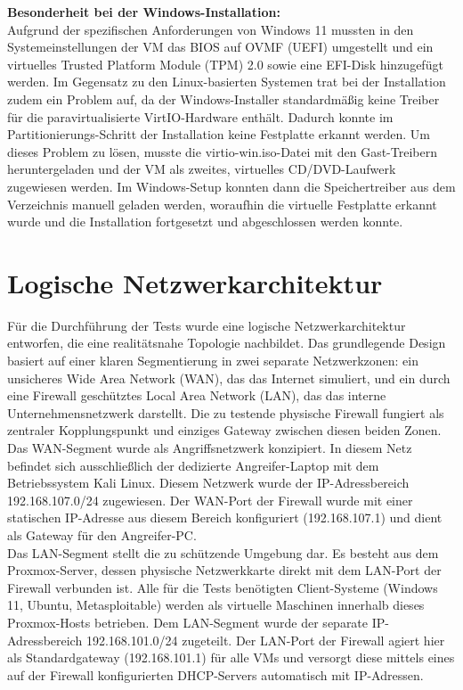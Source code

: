 \textbf{Besonderheit bei der Windows-Installation:}\\
Aufgrund der spezifischen Anforderungen von Windows 11 mussten in den Systemeinstellungen der VM das BIOS auf OVMF (UEFI) umgestellt und ein virtuelles Trusted Platform Module (TPM) 2.0 sowie eine EFI-Disk hinzugefügt werden.
 Im Gegensatz zu den Linux-basierten Systemen trat bei der Installation zudem ein Problem auf, da der Windows-Installer standardmäßig keine Treiber für die paravirtualisierte VirtIO-Hardware enthält. Dadurch konnte im Partitionierungs-Schritt der Installation keine Festplatte erkannt werden. Um dieses Problem zu lösen, musste die virtio-win.iso-Datei mit den Gast-Treibern heruntergeladen und der VM als zweites, virtuelles CD/DVD-Laufwerk zugewiesen werden. Im Windows-Setup konnten dann die Speichertreiber aus dem Verzeichnis  manuell geladen werden, woraufhin die virtuelle Festplatte erkannt wurde und die Installation fortgesetzt und abgeschlossen werden konnte.

\section{Logische Netzwerkarchitektur}

Für die Durchführung der Tests wurde eine logische Netzwerkarchitektur entworfen, die eine realitätsnahe Topologie nachbildet. Das grundlegende Design basiert auf einer klaren Segmentierung in zwei separate Netzwerkzonen: ein unsicheres Wide Area Network (WAN), das das Internet simuliert, und ein durch eine Firewall geschütztes Local Area Network (LAN), das das interne Unternehmensnetzwerk darstellt. Die zu testende physische Firewall fungiert als zentraler Kopplungspunkt und einziges Gateway zwischen diesen beiden Zonen.\\

Das WAN-Segment wurde als Angriffsnetzwerk konzipiert. In diesem Netz befindet sich ausschließlich der dedizierte Angreifer-Laptop mit dem Betriebssystem Kali Linux. Diesem Netzwerk wurde der IP-Adressbereich 192.168.107.0/24 zugewiesen. Der WAN-Port der Firewall wurde mit einer statischen IP-Adresse aus diesem Bereich konfiguriert (192.168.107.1) und dient als Gateway für den Angreifer-PC.\\

Das LAN-Segment stellt die zu schützende Umgebung dar. Es besteht aus dem Proxmox-Server, dessen physische Netzwerkkarte direkt mit dem LAN-Port der Firewall verbunden ist. Alle für die Tests benötigten Client-Systeme (Windows 11, Ubuntu, Metasploitable) werden als virtuelle Maschinen innerhalb dieses Proxmox-Hosts betrieben. Dem LAN-Segment wurde der separate IP-Adressbereich 192.168.101.0/24 zugeteilt. Der LAN-Port der Firewall agiert hier als Standardgateway (192.168.101.1) für alle VMs und versorgt diese mittels eines auf der Firewall konfigurierten DHCP-Servers automatisch mit IP-Adressen.\\

